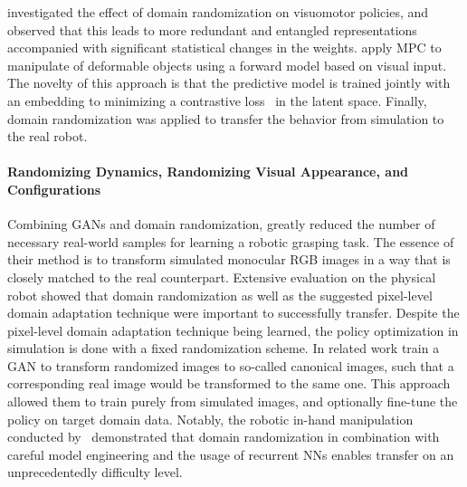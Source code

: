 \documentclass[utf8]{frontiersSCNS} %
\begin{document}
%
\citet{Dai_Arulkumaran_Bharath_19} investigated the effect of domain randomization on visuomotor policies, and observed that this leads to more redundant and entangled representations accompanied with significant statistical changes in the weights.
%
\citet{Yan_Pinto_20} apply \ac{MPC} to manipulate of deformable objects using a forward model based on visual input.
The novelty of this approach is that the predictive model is trained jointly with an embedding to minimizing a contrastive loss~\citep{Oord_Vinyals_18} in the latent space.
Finally, domain randomization was applied to transfer the behavior from simulation to the real robot.

\paragraph*{Randomizing Dynamics, Randomizing Visual Appearance, and Configurations}
Combining \acp{GAN} and domain randomization, \citet{Bousmalis_Irpan_Wohlhart_Vanhoucke_18} greatly reduced the number of necessary real-world samples for learning a robotic grasping task.
The essence of their method is to transform simulated monocular \acs{RGB} images in a way that is closely matched to the real counterpart.
Extensive evaluation on the physical robot showed that domain randomization as well as the suggested pixel-level domain adaptation technique were important to successfully transfer.
Despite the pixel-level domain adaptation technique being learned, the policy optimization in simulation is done with a fixed randomization scheme.
In related work \citet{James_Bousmalis_19} train a \ac{GAN} to transform randomized images to so-called canonical images, such that a corresponding real image would be transformed to the same one.
This approach allowed them to train purely from simulated images, and optionally fine-tune the policy on target domain data.
%
Notably, the robotic in-hand manipulation conducted by~\citet{OpenAI_18} demonstrated that domain randomization in combination with careful model engineering and the usage of recurrent \acp{NN} enables \simtoreal transfer on an unprecedentedly difficulty level.


\end{document}
